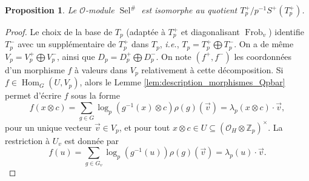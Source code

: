 \documentclass[12pt]{amsart}
\newcommand\Zp{{\mathbb{Z}_{p}}}
\newcommand\cO{\mathcal{O}}
\DeclareMathOperator{\Hom}{Hom}
\DeclareMathOperator{\Frob}{Frob}
\DeclareMathOperator{\Sel}{Sel}
\theoremstyle{defstyle}
\theoremstyle{thmstyle}
\newtheorem{proposition}[subsubsection]{Proposition}
\begin{document}
\begin{proposition}\label{prop:cyc}
	Le $\cO$-module $\Sel^\#$ est isomorphe au quotient $T_p^+/p^{-1}S^+\left(T_p^+\right)$.
\end{proposition}
\begin{proof}
	Le choix de la base de $T_p$ (adaptée à $T_p^+$ et diagonalisant $\Frob_v$) identifie $T_p^-$ avec un supplémentaire de $T_p^+$ dans $T_p$, \textit{i.e.}, $T_p=T_p^+\bigoplus T_p^-$. On a de même $V_p=V_p^+ \bigoplus V_p^-$, ainsi que $D_p=D_p^+ \bigoplus D_p^-$. 
	On note $(f^+,f^-)$ les coordonnées d'un morphisme $f$ à valeurs dans $V_p$ relativement à cette décomposition. Si $f\in \Hom_G(U,V_p)$, alors le Lemme \ref{lem:description_morphismes_Qpbar} permet d'écrire $f$ sous la forme 
	$$f(x\otimes c) = \sum_{g \in G} \log_p \left(g^{-1}(x)\otimes c \right)\rho(g)(\vec{v}) = \lambda_p(x\otimes c) \cdot \vec{v}, $$ 
	pour un unique vecteur $\vec{v}\in V_p$, et pour tout $x\otimes c \in U \subseteq \left(\cO_H \otimes \Zp\right)^\times$. La restriction à $U_{v}$ est donnée par 
	\begin{equation}\label{eq:expression_f_locale}
	f(u) = \sum_{g\in G_{v}}  \log_p\left(g^{-1}(u)\right)\rho(g)(\vec{v}) = \lambda_p(u)\cdot \vec{v}. 
	\end{equation}
	

\end{proof}
\end{document}
